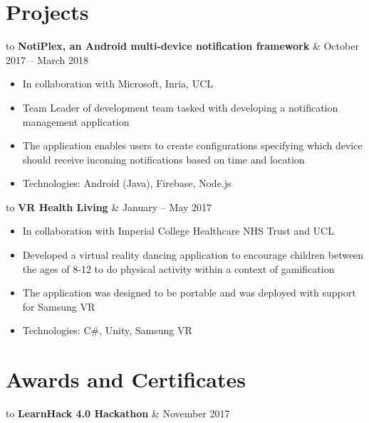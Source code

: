 \documentclass[a4paper, 10pt]{article}
\makeatletter
\newenvironment{details}{\addvspace{3pt} \begin{tabu} to \textwidth {@{}X[2l] X[1r]@{}}}{\end{tabu}}
\newcommand{\timerange}[1]{\normalsize #1}
\newcommand{\project}[1]{\normalsize \textbf{#1}}
\newcommand{\award}[1]{\normalsize \textbf{#1}}
\newenvironment{info}{\small \begin{itemize}[
    noitemsep,
    topsep=-3pt,
    leftmargin=*,
    align=parleft
]}{\end{itemize}}
\makeatother
\begin{document}
    \section*{Projects}

        \begin{details}
            \project{NotiPlex, an Android multi-device notification framework} & \timerange{October 2017 -- March 2018}
        \end{details}
        
        \begin{info}
            \item In collaboration with Microsoft, Inria, UCL
            \item Team Leader of development team tasked with developing a notification management application
            \item The application enables users to create configurations specifying which device should receive incoming notifications based on time and location
            \item Technologies: Android (Java), Firebase, Node.js
        \end{info}

        \begin{details}
            \project{VR Health Living} & \timerange{January -- May 2017}
        \end{details}
        
        \begin{info}
            \item In collaboration with Imperial College Healthcare NHS Trust and UCL
            \item Developed a virtual reality dancing application to encourage children between the ages of 8-12 to do physical activity within a context of gamification
            \item The application was designed to be portable and was deployed with support for Samsung VR
            \item Technologies: C\#, Unity, Samsung VR
        \end{info}

    \section*{Awards and Certificates}

        \begin{details}
            \award{LearnHack 4.0 Hackathon} & \timerange{November 2017}
        \end{details}
        
\end{document}
